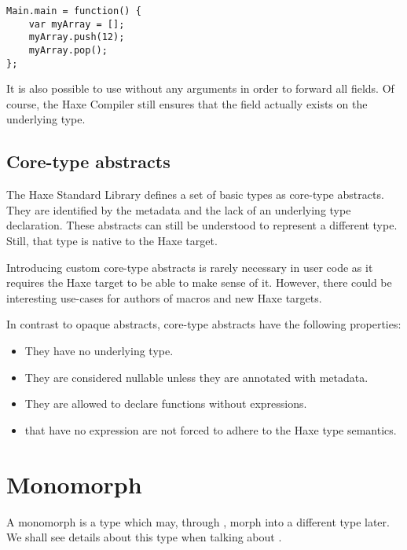 \begin{lstlisting}
Main.main = function() {
	var myArray = [];
	myArray.push(12);
	myArray.pop();
};
\end{lstlisting}

It is also possible to use  without any arguments in order to forward all fields. Of course, the Haxe Compiler still ensures that the field actually exists on the underlying type.



\subsection{Core-type abstracts}
\label{types-abstract-core-type}

The Haxe Standard Library defines a set of basic types as core-type abstracts. They are identified by the  metadata and the lack of an underlying type declaration. These abstracts can still be understood to represent a different type. Still, that type is native to the Haxe target. 

Introducing custom core-type abstracts is rarely necessary in user code as it requires the Haxe target to be able to make sense of it. However, there could be interesting use-cases for authors of macros and new Haxe targets.

In contrast to opaque abstracts, core-type abstracts have the following properties:

\begin{itemize}
	\item They have no underlying type.
	\item They are considered nullable unless they are annotated with  metadata.
	\item They are allowed to declare  functions without expressions.
	\item {} that have no expression are not forced to adhere to the Haxe type semantics.
\end{itemize}



\section{Monomorph}
\label{types-monomorph}

A monomorph is a type which may, through , morph into a different type later. We shall see details about this type when talking about .
